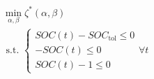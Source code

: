 \begin{equation}
\begin{split}
	&\min_{\alpha,\beta} \zeta^*(\alpha, \beta) \\
	&\text{ s.t. }
	\begin{cases}
		SOC(t) - SOC_\text{tol} \leq 0\\
		-SOC(t) \leq 0\\
		SOC(t) - 1 \leq 0
	\end{cases}
	\forall t
\end{split}
\label{ch2:equ:cost-weights}
\end{equation}